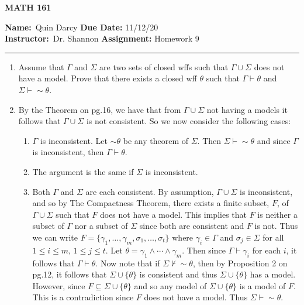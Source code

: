 \documentclass[12pt]{article}
\makeatletter
\theoremstyle{definition}
\theoremstyle{remark}
\renewenvironment{proof}[1][\proofname]{\par
  \pushQED{\qed}%
  \normalfont \topsep6\p@\@plus6\p@\relax
  \list{}{\leftmargin=0mm
          \rightmargin=4mm
          \settowidth{\itemindent}{\itshape#1}%
          \labelwidth=\itemindent
          \parsep=0pt \listparindent=\parindent 
  }
  \item[\hskip\labelsep
        \itshape
    #1\@addpunct{.}]\ignorespaces
}{%
  \popQED\endlist\@endpefalse
}
\let\oldproofname=\proofname
\renewcommand{\proofname}{\bf{\textit{\oldproofname}}}
\makeatother
\begin{document}
\thispagestyle{empty}\hline

\begin{center}
	\vspace{.4cm} {\textbf { \large MATH 161}}
\end{center}
{\textbf{Name:}\ Quin Darcy \hspace{\fill} \textbf{Due Date:} 11/12/20   \\
{ \textbf{Instructor:}}\ Dr. Shannon \hspace{\fill} \textbf{Assignment:} Homework 9 \\ \hrule}

\justifying
    \begin{enumerate}[leftmargin=*]
        \item Assume that $\Gamma$ and $\Sigma$ are two sets of closed wffs such that $\Gamma\cup\Sigma$ does not have a model. Prove that there exists a closed wff $\theta$ such that $\Gamma\vdash\theta$ and $\Sigma\vdash\sim\theta$.
            \begin{proof}
                By the Theorem on pg.16, we have that from $\Gamma\cup\Sigma$ not having a models it follows that $\Gamma\cup\Sigma$ is not consistent. So we now consider the following cases:\hfill\par\hspace{4mm}
                    \begin{enumerate}[label=(\roman*)]
                        \item $\Gamma$ is inconsistent. Let $\sim\theta$ be any theorem of $\Sigma$. Then $\Sigma\vdash\sim\theta$ and since $\Gamma$ is inconsistent, then $\Gamma\vdash\theta$.
                        \item The argument is the same if $\Sigma$ is inconsistent.
                        \item Both $\Gamma$ and $\Sigma$ are each consistent. By assumption, $\Gamma\cup\Sigma$ is inconsistent, and so by The Compactness Theorem, there exists a finite subset, $F$, of $\Gamma\cup\Sigma$ such that $F$ does not have a model. This implies that $F$ is neither a subset of $\Gamma$ nor a subset of $\Sigma$ since both are consistent and $F$ is not. Thus we can write $F=\{\gamma_1, \dots, \gamma_m, \sigma_1,\dots, \sigma_t\}$ where $\gamma_i\in\Gamma$ and $\sigma_j\in\Sigma$ for all $1\leq i\leq m$, $1\leq j\leq t$. Let $\theta=\gamma_1\land\cdots\land\gamma_m$. Then since $\Gamma\vdash\gamma_i$ for each $i$, it follows that $\Gamma\vdash\theta$. Now note that if $\Sigma\not\vdash\sim\theta$, then by Proposition 2 on pg.12, it follows that $\Sigma\cup\{\theta\}$ is consistent and thus $\Sigma\cup\{\theta\}$ has a model. However, since $F\subseteq\Sigma\cup\{\theta\}$ and so any model of $\Sigma\cup\{\theta\}$ is a model of $F$. This is a contradiction since $F$ does not have a model. Thus $\Sigma\vdash\sim\theta$.

\end{enumerate}
\end{proof}
\end{enumerate}
\end{document}
